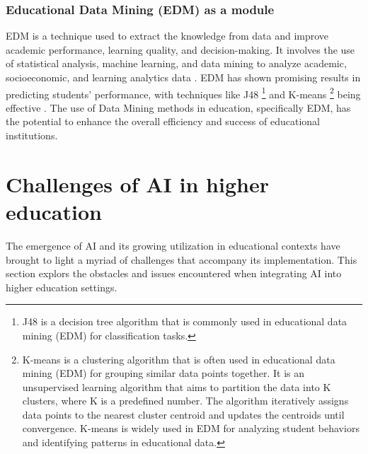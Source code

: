 \subsubsection{Educational Data Mining (EDM) as a module}
EDM is a technique used to extract the knowledge from data and improve academic performance, learning quality, and decision-making. 
It involves the use of statistical analysis, machine learning, and data mining to analyze academic, socioeconomic, 
and learning analytics data \citep{hooda_integrating_2022, arifin_using_2022}. EDM has shown promising results in predicting students' 
performance, with techniques like J48 \footnote{J48 is a decision tree algorithm that is commonly used in 
educational data mining (EDM) for classification tasks.} and K-means \footnote{ K-means is a clustering algorithm that is often used in educational data mining 
(EDM) for grouping similar data points together.  
It is an unsupervised learning algorithm that aims to partition the data into K clusters, where K is a predefined number. 
The algorithm iteratively assigns data points to the nearest cluster centroid and updates the centroids until convergence. 
K-means is widely used in EDM for analyzing student behaviors and identifying patterns in educational data.} being effective \citep{prince_sattam_bin_abdulaziz_university_state_2016}. 
The use of Data Mining methods in education, specifically EDM, has the potential to enhance the overall efficiency and success of educational institutions.

\section{Challenges of AI in higher education}
The emergence of AI and its growing utilization in educational contexts have 
brought to light a myriad of challenges that accompany its implementation.
This section explors the obstacles and issues encountered when integrating AI into
higher education settings.

